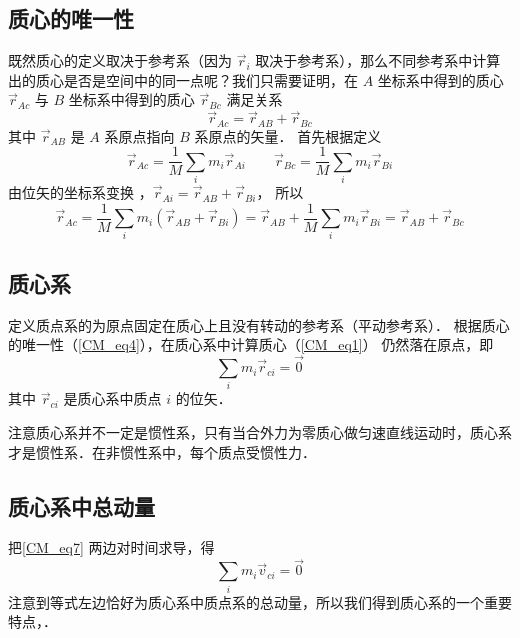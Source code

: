 \subsection{质心的唯一性}
既然质心的定义取决于参考系（因为 $\vec r_i$ 取决于参考系），那么不同参考系中计算出的质心是否是空间中的同一点呢？我们只需要证明，在 $A$ 坐标系中得到的质心 $\vec r_{Ac}$ 与 $B$ 坐标系中得到的质心 $\vec r_{Bc}$ 满足关系
\begin{equation}\label{CM_eq4}
\vec r_{Ac} = \vec r_{AB} + \vec r_{Bc}
\end{equation}
其中 $\vec r_{AB}$ 是 $A$ 系原点指向 $B$ 系原点的矢量． 首先根据定义
\begin{equation}
\vec r_{Ac} = \frac{1}{M}\sum_i m_i \vec r_{Ai}  \qquad \vec r_{Bc} = \frac{1}{M}\sum_i  m_i \vec r_{Bi} 
\end{equation}
由位矢的坐标系变换%
，$\vec r_{Ai} = \vec r_{AB} + \vec r_{Bi}$， 所以
\begin{equation}
\vec r_{Ac} = \frac{1}{M}\sum_i m_i(\vec r_{AB} + \vec r_{Bi})  = \vec r_{AB} + \frac{1}{M} \sum_i m_i \vec r_{Bi}  = \vec r_{AB} + \vec r_{Bc}
\end{equation}
 
\subsection{质心系}
定义质点系的为原点固定在质心上且没有转动的参考系（平动参考系）．%
根据质心的唯一性（\autoref{CM_eq4}），在质心系中计算质心（\autoref{CM_eq1}） 仍然落在原点，即
\begin{equation}\label{CM_eq7}
\sum_i m_i \vec r_{ci} = \vec 0
\end{equation}
其中 $\vec r_{ci}$ 是质心系中质点 $i$ 的位矢．

注意质心系并不一定是惯性系，只有当合外力为零质心做匀速直线运动时，质心系才是惯性系．在非惯性系中，每个质点受惯性力．

\subsection{质心系中总动量}
把\autoref{CM_eq7} 两边对时间求导，得
\begin{equation}\label{CM_eq8}
\sum_i m_i \vec v_{ci} = \vec 0
\end{equation}
注意到等式左边恰好为质心系中质点系的总动量，所以我们得到质心系的一个重要特点，．

